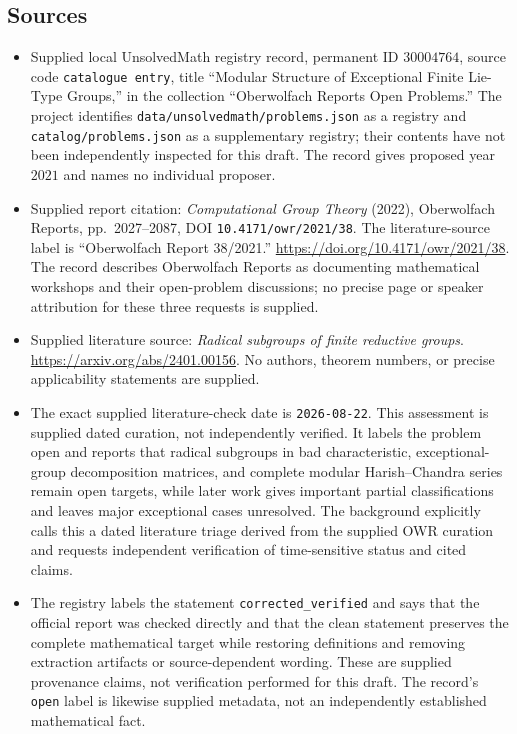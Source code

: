 \documentclass[11pt]{article}
\begin{document}
\subsection{Sources}
\begin{itemize}
\item Supplied local UnsolvedMath registry record, permanent ID \(30004764\), source code \texttt{catalogue entry}, title ``Modular Structure of Exceptional Finite Lie-Type Groups,'' in the collection ``Oberwolfach Reports Open Problems.'' The project identifies \texttt{data/unsolvedmath/problems.json} as a registry and \texttt{catalog/problems.json} as a supplementary registry; their contents have not been independently inspected for this draft. The record gives proposed year \(2021\) and names no individual proposer.
\item Supplied report citation: \emph{Computational Group Theory} (2022), Oberwolfach Reports, pp.~2027--2087, DOI \texttt{10.4171/owr/2021/38}. The literature-source label is ``Oberwolfach Report 38/2021.'' \url{https://doi.org/10.4171/owr/2021/38}. The record describes Oberwolfach Reports as documenting mathematical workshops and their open-problem discussions; no precise page or speaker attribution for these three requests is supplied.
\item Supplied literature source: \emph{Radical subgroups of finite reductive groups}. \url{https://arxiv.org/abs/2401.00156}. No authors, theorem numbers, or precise applicability statements are supplied.
\item The exact supplied literature-check date is \texttt{2026-08-22}. This assessment is supplied dated curation, not independently verified. It labels the problem open and reports that radical subgroups in bad characteristic, exceptional-group decomposition matrices, and complete modular Harish--Chandra series remain open targets, while later work gives important partial classifications and leaves major exceptional cases unresolved. The background explicitly calls this a dated literature triage derived from the supplied OWR curation and requests independent verification of time-sensitive status and cited claims.
\item The registry labels the statement \texttt{corrected\_verified} and says that the official report was checked directly and that the clean statement preserves the complete mathematical target while restoring definitions and removing extraction artifacts or source-dependent wording. These are supplied provenance claims, not verification performed for this draft. The record's \texttt{open} label is likewise supplied metadata, not an independently established mathematical fact.
\end{itemize}
\end{document}
